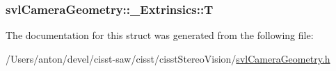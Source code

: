 \subsubsection[{T}]{ svl\+Camera\+Geometry\+::\+\_\+\+Extrinsics\+::\+T}\label{structsvl_camera_geometry_1_1___extrinsics_aa41edbc90833a086ff1fff5c11fa7eb8}


The documentation for this struct was generated from the following file\+:\begin{DoxyCompactItemize}
\item 
/\+Users/anton/devel/cisst-\/saw/cisst/cisst\+Stereo\+Vision/\hyperlink{svl_camera_geometry_8h}{svl\+Camera\+Geometry.\+h}\end{DoxyCompactItemize}
